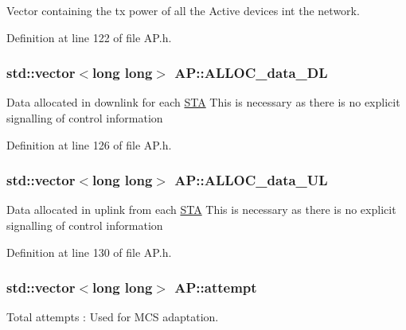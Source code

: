 Vector containing the tx power of all the Active devices int the network. 



Definition at line 122 of file A\-P.\-h.

\hypertarget{classAP_a88e8d95cfbca5d598ec6cd900efa2b30}{
\subsubsection[{A\-L\-L\-O\-C\-\_\-data\-\_\-\-D\-L}]{\setlength{\rightskip}{0pt plus 5cm}std\-::vector$<$long long$>$ A\-P\-::\-A\-L\-L\-O\-C\-\_\-data\-\_\-\-D\-L}}\label{classAP_a88e8d95cfbca5d598ec6cd900efa2b30}
Data allocated in downlink for each \hyperlink{classSTA}{S\-T\-A} This is necessary as there is no explicit signalling of control information 

Definition at line 126 of file A\-P.\-h.

\hypertarget{classAP_ae5567916229fb09fbb83af3cfad5d71d}{
\subsubsection[{A\-L\-L\-O\-C\-\_\-data\-\_\-\-U\-L}]{\setlength{\rightskip}{0pt plus 5cm}std\-::vector$<$long long$>$ A\-P\-::\-A\-L\-L\-O\-C\-\_\-data\-\_\-\-U\-L}}\label{classAP_ae5567916229fb09fbb83af3cfad5d71d}
Data allocated in uplink from each \hyperlink{classSTA}{S\-T\-A} This is necessary as there is no explicit signalling of control information 

Definition at line 130 of file A\-P.\-h.

\hypertarget{classAP_aa15c857fb5fb5d7688f1ee49d43a2aee}{
\subsubsection[{attempt}]{\setlength{\rightskip}{0pt plus 5cm}std\-::vector$<$long long$>$ A\-P\-::attempt}}\label{classAP_aa15c857fb5fb5d7688f1ee49d43a2aee}


Total attempts \-: Used for M\-C\-S adaptation. 




